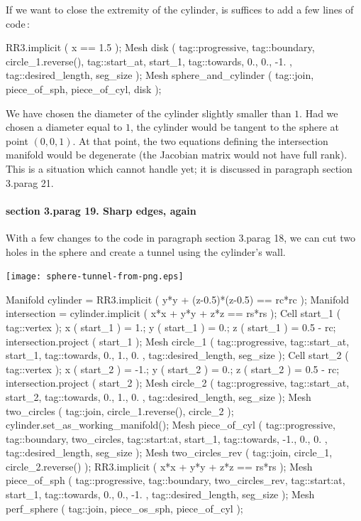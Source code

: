 If we want to close the extremity of the cylinder, is suffices to add a few lines of code$\,$:

\verbatim
   RR3.implicit ( x == 1.5 );
   Mesh disk ( tag::progressive, tag::boundary, circle_1.reverse(),
               tag::start_at, start_1, tag::towards, { 0., 0., -1. },
               tag::desired_length, seg_size                          );
   Mesh sphere_and_cylinder ( tag::join, piece_of_sph, piece_of_cyl, disk );
\endverbatim

We have chosen the diameter of the cylinder slightly smaller than $1$.
Had we chosen a diameter equal to $1$, the cylinder would be tangent to the sphere at point
$ (0,0,1) $.
At that point, the two equations defining the {\codett intersection} manifold would be
degenerate (the Jacobian matrix would not have full rank).
This is a situation which {\maniFEM} cannot handle yet; it is discussed in paragraph
\numb section 3.\numb parag 21.


\paragraph{\numb section 3.\numb parag 19. Sharp edges, again}

With a few changes to the code in paragraph \numb section 3.\numb parag 18,
we can cut two holes in the sphere and create a tunnel using the cylinder's wall.
\medskip

\centerline{\texttt{[image: sphere-tunnel-from-png.eps]}}

\verbatim
   Manifold cylinder = RR3.implicit ( y*y + (z-0.5)*(z-0.5) == rc*rc );
   Manifold intersection = cylinder.implicit ( x*x + y*y + z*z == rs*rs );
   Cell start_1 ( tag::vertex );
   x ( start_1 ) = 1.;  y ( start_1 ) = 0.;  z ( start_1 ) = 0.5 - rc;
   intersection.project ( start_1 );
   Mesh circle_1 ( tag::progressive, tag::start_at, start_1,
                   tag::towards, { 0., 1., 0. }, tag::desired_length, seg_size );
   Cell start_2 ( tag::vertex );
   x ( start_2 ) = -1.;  y ( start_2 ) = 0.;  z ( start_2 ) = 0.5 - rc;
   intersection.project ( start_2 );
   Mesh circle_2 ( tag::progressive, tag::start_at, start_2,
                   tag::towards, { 0., 1., 0. }, tag::desired_length, seg_size );
   Mesh two_circles ( tag::join, circle_1.reverse(), circle_2 );
   cylinder.set_as_working_manifold();
   Mesh piece_of_cyl ( tag::progressive, tag::boundary, two_circles,
                       tag::start:at, start_1, tag::towards, { -1., 0., 0. },
                       tag::desired_length, seg_size                          );
   Mesh two_circles_rev ( tag::join, circle_1, circle_2.reverse() );
   RR3.implicit ( x*x + y*y + z*z == rs*rs );
   Mesh piece_of_sph ( tag::progressive, tag::boundary, two_circles_rev,
                       tag::start:at, start_1, tag::towards, { 0., 0., -1. },
                       tag::desired_length, seg_size                          );
   Mesh perf_sphere ( tag::join, piece_os_sph, piece_of_cyl );
\endverbatim


